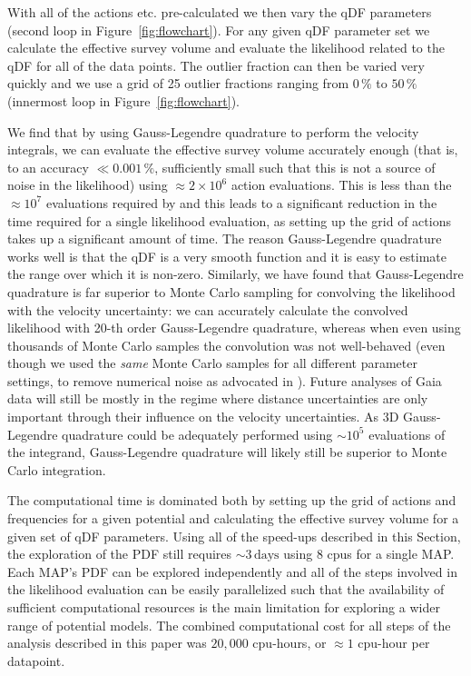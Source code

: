 \documentclass{emulateapj}
\renewcommand{\figurename}{Figure}
\newcommand{\map}{MAP}
\begin{document}
With all of the actions etc. pre-calculated we then vary the qDF
parameters (second loop in \figurename~\ref{fig:flowchart}). For any
given qDF parameter set we calculate the effective survey volume and
evaluate the likelihood related to the qDF for all of the data
points. The outlier fraction can then be varied very quickly and we
use a grid of 25 outlier fractions ranging from $0\,\%$ to $50\,\%$
(innermost loop in \figurename~\ref{fig:flowchart}).

We find that by using Gauss-Legendre quadrature to perform the
velocity integrals, we can evaluate the effective survey volume
accurately enough (that is, to an accuracy $\ll 0.001\,\%$,
sufficiently small such that this is not a source of noise in the
likelihood) using $\approx2\times10^6$ action evaluations. This is
less than the $\approx10^7$ evaluations required by
\citet{McMillan13a} and this leads to a significant reduction in the
time required for a single likelihood evaluation, as setting up the
grid of actions takes up a significant amount of time. The reason
Gauss-Legendre quadrature works well is that the qDF is a very smooth
function and it is easy to estimate the range over which it is
non-zero. Similarly, we have found that Gauss-Legendre quadrature is
far superior to Monte Carlo sampling for convolving the likelihood
with the velocity uncertainty: we can accurately calculate the
convolved likelihood with 20-th order Gauss-Legendre quadrature,
whereas when even using thousands of Monte Carlo samples the
convolution was not well-behaved (even though we used the \emph{same}
Monte Carlo samples for all different parameter settings, to remove
numerical noise as advocated in \citealt{Ting13a}). Future analyses of
Gaia data will still be mostly in the regime where distance
uncertainties are only important through their influence on the
velocity uncertainties. As 3D Gauss-Legendre quadrature could be
adequately performed using $\sim\!10^5$ evaluations of the integrand,
Gauss-Legendre quadrature will likely still be superior to Monte Carlo
integration.

The computational time is dominated both by setting up the grid of
actions and frequencies for a given potential and calculating the
effective survey volume for a given set of qDF parameters. Using all
of the speed-ups described in this Section, the exploration of the PDF
still requires $\sim\!3\,\mathrm{days}$ using 8 cpus for a single
\map. Each \map's PDF can be explored independently and all of the
steps involved in the likelihood evaluation can be easily
parallelized such that the availability of sufficient computational
resources is the main limitation for exploring a wider range of
potential models. The combined computational cost for all steps of
the analysis described in this paper was $20,000$ cpu-hours, or
$\approx\!1$ cpu-hour per datapoint.
\end{document}
